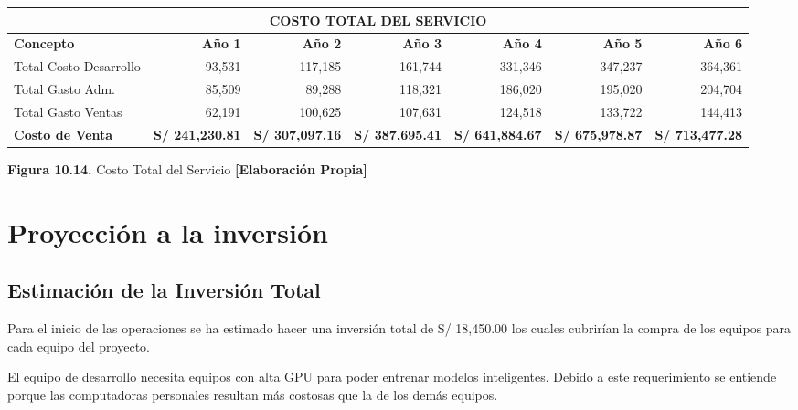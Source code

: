 \begin{table}[H]
\centering
\scriptsize
\renewcommand{\arraystretch}{1.15}
\setlength{\tabcolsep}{5pt}
\begin{tabular}{|l|r|r|r|r|r|r|}
\hline
\multicolumn{7}{|c|}{\textbf{COSTO TOTAL DEL SERVICIO}} \\ \hline
\textbf{Concepto} & \textbf{Año 1} & \textbf{Año 2} & \textbf{Año 3} & \textbf{Año 4} & \textbf{Año 5} & \textbf{Año 6} \\ \hline
Total Costo Desarrollo & 93,531 & 117,185 & 161,744 & 331,346 & 347,237 & 364,361 \\ \hline
Total Gasto Adm. & 85,509 & 89,288 & 118,321 & 186,020 & 195,020 & 204,704 \\ \hline
Total Gasto Ventas & 62,191 & 100,625 & 107,631 & 124,518 & 133,722 & 144,413 \\ \hline
\textbf{Costo de Venta} & \textbf{S/ 241,230.81} & \textbf{S/ 307,097.16} & \textbf{S/ 387,695.41} & \textbf{S/ 641,884.67} & \textbf{S/ 675,978.87} & \textbf{S/ 713,477.28} \\ \hline
\end{tabular}

\vspace{0.2cm}
\textbf{Figura 10.14.} Costo Total del Servicio \textbf{[Elaboración Propia]}
\end{table}

\section{Proyección a la inversión}

\subsection{Estimación de la Inversión Total}

Para el inicio de las operaciones se ha estimado hacer una inversión total de S/ 18,450.00 los cuales cubrirían la compra de los equipos para cada equipo del proyecto.

El equipo de desarrollo necesita equipos con alta GPU para poder entrenar modelos inteligentes. Debido a este requerimiento se entiende porque las computadoras personales resultan más costosas que la de los demás equipos.
